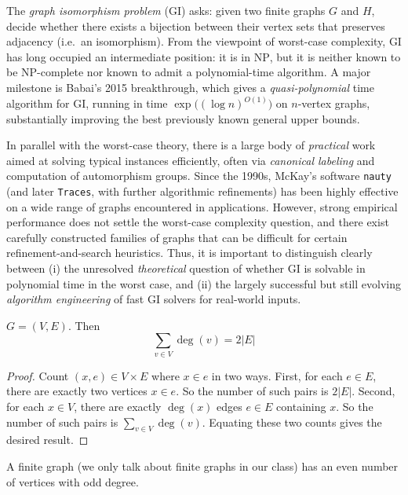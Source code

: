 \documentclass[11pt, a4paper]{ctexrep}
\begin{document}
The \emph{graph isomorphism problem} (GI) asks: given two finite graphs $G$ and $H$, decide whether there exists a bijection between their vertex sets that preserves adjacency (i.e.\ an isomorphism).  From the viewpoint of worst-case complexity, GI has long occupied an intermediate position: it is in $\mathrm{NP}$, but it is neither known to be $\mathrm{NP}$-complete nor known to admit a polynomial-time algorithm.  A major milestone is Babai's 2015 breakthrough, which gives a \emph{quasi-polynomial} time algorithm for GI, running in time $\exp\!\big((\log n)^{O(1)}\big)$ on $n$-vertex graphs, substantially improving the best previously known general upper bounds.

In parallel with the worst-case theory, there is a large body of \emph{practical} work aimed at solving typical instances efficiently, often via \emph{canonical labeling} and computation of automorphism groups.  Since the 1990s, McKay's software \texttt{nauty} (and later \texttt{Traces}, with further algorithmic refinements) has been highly effective on a wide range of graphs encountered in applications.  However, strong empirical performance does not settle the worst-case complexity question, and there exist carefully constructed families of graphs that can be difficult for certain refinement-and-search heuristics.  Thus, it is important to distinguish clearly between (i) the unresolved \emph{theoretical} question of whether GI is solvable in polynomial time in the worst case, and (ii) the largely successful but still evolving \emph{algorithm engineering} of fast GI solvers for real-world inputs.

\begin{proposition}
    $ G=(V,E) $. Then
    \[
        \sum_{v \in V} \deg(v) = 2|E|
    \]
\end{proposition}

\begin{proof}
    Count $ (x,e) \in V \times E $ where $ x \in e $ in two ways. First, for each $ e \in E $, there are exactly two vertices $ x \in e $. So the number of such pairs is $ 2|E| $. Second, for each $ x \in V $, there are exactly $ \deg(x) $ edges $ e \in E $ containing $ x $. So the number of such pairs is $ \sum_{v \in V} \deg(v) $. Equating these two counts gives the desired result.
\end{proof}

\begin{theorem}
    A finite graph (we only talk about finite graphs in our class) has an even number of vertices with odd degree.
\end{theorem}
\end{document}
